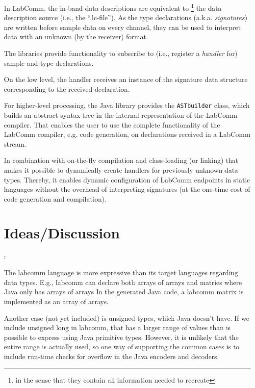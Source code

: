 \documentclass[a4paper]{article}
\begin{document}
In LabComm, the in-band data descriptions are equivalent to \footnote{in
the sense that they contain all information needed to recreate} the data
description source (i.e., the ``.lc-file'').
%
As the type declarations (a.k.a. \emph{signatures}) are written before
sample data on every channel, they can be used to interpret data with
an unknown (by the receiver) format.

The libraries provide functionality to subscribe to (i.e., register a
\emph{handler} for) sample and type declarations.

On the low level, the handler receives an instance of the signature
data structure corresponding to the received declaration.


For higher-level processing, the Java library provides the
\verb+ASTbuilder+ class, which builds an abstract syntax tree in
the internal representation of the LabComm compiler.
That enables the user to use the complete functionality of the
LabComm compiler, e.g. code generation,  on declarations received in a
LabComm stream. 


In combination with on-the-fly compilation and class-loading (or
linking) that makes it possible to dynamically create handlers for
previously unknown data types. Thereby, it enables dynamic configuration
of LabComm endpoints in static languages without the overhead of
interpreting signatures (at the one-time cost of code generation and
compilation).







\section{Ideas/Discussion}:

The labcomm language is more expressive than its target languages regarding data types.
E.g., labcomm can declare both arrays of arrays and matries where Java only has arrays of arrays
In the generated Java code, a labcomm matrix is implemented as an array of arrays.

Another case (not yet included) is unsigned types, which Java doesn't have. If we include
unsigned long in labcomm, that has a larger range of values than is possible to express using
Java primitive types. However, it is unlikely that the entire range is actually used, so one
way of supporting the common cases is to include run-time checks for overflow in the Java encoders
and decoders.
\end{document}
